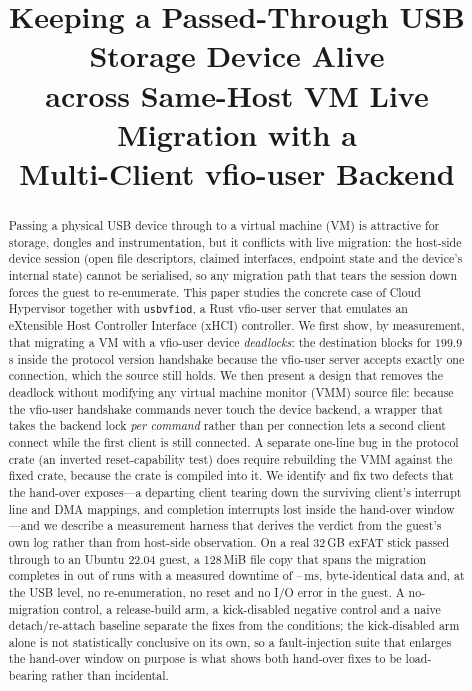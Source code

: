 \documentclass[10pt,conference]{IEEEtran}
\title{Keeping a Passed-Through USB Storage Device Alive\\
across Same-Host VM Live Migration with a\\
Multi-Client vfio-user Backend}
\author{\IEEEauthorblockN{Anonymous Submission}
\IEEEauthorblockA{Paper ID: \texttt{usbvfiod-usb-migration}\\
Author names, affiliations and contact addresses are withheld for
double-blind review.}}
\newcommand{\code}[1]{\texttt{#1}}
\begin{document}
\maketitle

\begin{abstract}
Passing a physical USB device through to a virtual machine (VM) is attractive
for storage, dongles and instrumentation, but it conflicts with live migration:
the host-side device session (open file descriptors, claimed interfaces,
endpoint state and the device's internal state) cannot be serialised, so any
migration path that tears the session down forces the guest to re-enumerate.
This paper studies the concrete case of Cloud Hypervisor together with
\code{usbvfiod}, a Rust vfio-user server that emulates an eXtensible Host Controller Interface (xHCI) controller. We
first show, by measurement, that migrating a VM with a vfio-user device
\emph{deadlocks}: the destination blocks for $199.9$\,s inside the protocol
version handshake because the vfio-user server accepts exactly one connection,
which the source still holds. We then present a design that removes the
deadlock without modifying any virtual machine monitor (VMM) source file: because
the vfio-user handshake commands
never touch the device backend, a wrapper that takes the backend lock
\emph{per command} rather than per connection lets a second client connect
while the first client is still connected. A separate one-line bug in the
protocol crate (an inverted reset-capability test) does require rebuilding the
VMM against the fixed crate, because the crate is compiled into it. We identify
and fix two defects that the hand-over exposes---a departing client tearing down
the surviving client's interrupt line and DMA mappings, and completion
interrupts lost inside the hand-over window---and we describe a measurement
harness that derives the verdict from the
guest's own log rather than from host-side observation.
On a real 32\,GB exFAT stick passed through to an Ubuntu 22.04 guest, a
128\,MiB file copy that spans the migration completes in \PassCount{} out of \TotalRuns{} runs with a measured downtime of \DowntimeMin--\DowntimeMax\,ms, byte-identical data and, at the USB
level, no re-enumeration, no reset and no I/O error in the guest. A
no-migration control, a release-build arm, a kick-disabled negative control and
a naive detach/re-attach baseline separate the fixes from the conditions; the
kick-disabled arm alone is not statistically conclusive on its own, so a
fault-injection suite that enlarges the hand-over window on purpose is what
shows both hand-over fixes to be load-bearing rather than incidental.
\end{abstract}
\end{document}

